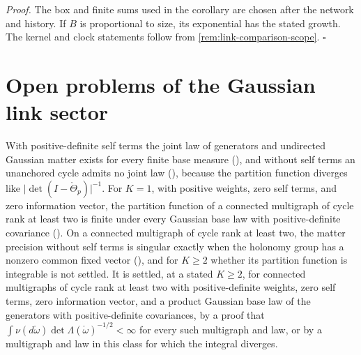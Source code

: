 \noindent\emph{Proof.}
The box and finite sums used in the corollary are chosen after the network and
history. If $B$ is proportional to size, its exponential has the stated growth.
The kernel and clock statements follow from \cref{rem:link-comparison-scope}.
$\square$

\section{Open problems of the Gaussian link sector}
\label{sec:glink-open}

With positive-definite self terms the joint law of generators and undirected Gaussian matter exists for
every finite base measure (), and without self terms an unanchored cycle
admits no joint law (), because the partition function diverges like
\(\lvert\det(I-\mathring\Theta_p)\rvert^{-1}\). For \(K=1\), with positive weights, zero self terms, and
zero information vector, the partition function of a connected multigraph of cycle rank at least two is
finite under every Gaussian base law with positive-definite covariance
(). On a connected multigraph of cycle rank at least two, the
matter precision without self terms is singular exactly when the holonomy group has a nonzero common
fixed vector (), and for \(K\geq2\) whether its partition function is
integrable is not settled. It is settled, at a stated \(K\geq2\), for connected multigraphs of cycle rank
at least two with positive-definite weights, zero self terms, zero information vector, and a product
Gaussian base law of the generators with positive-definite covariances, by a proof that
\(\int\nu(d\mathring\omega)\det\Lambda(\mathring\omega)^{-1/2}<\infty\) for every such multigraph and law,
or by a multigraph and law in this class for which the integral diverges.

